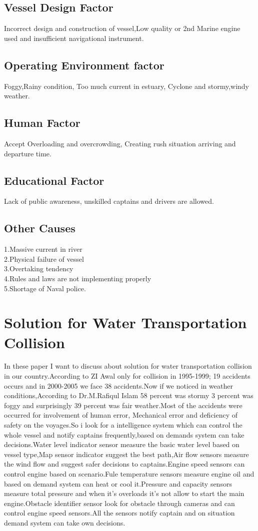 \documentclass{article}
\begin{document}
\subsection{Vessel Design Factor}
Incorrect design and construction of vessel,Low quality or 2nd Marine engine used and insufficient navigational instrument.
\subsection{Operating Environment factor}
Foggy,Rainy condition, Too much current in estuary, Cyclone and stormy,windy weather.
\subsection{Human Factor}
Accept Overloading and overcrowding, Creating rush situation arriving and departure time.
\subsection{Educational Factor}
Lack of public awareness, unskilled captains and drivers are allowed.
\subsection{Other Causes}
1.Massive current in river\\
2.Physical failure of vessel\\
3.Overtaking tendency\\
4.Rules and laws are not implementing properly\\
5.Shortage of Naval police\cite{ibn2010collision}.
\section{Solution for Water Transportation Collision}
In these paper I want to discuss about solution for water transportation collision in our country.According to ZI Awal only for collision in 1995-1999; 19 accidents occurs and in 2000-2005 we face 38 accidents\cite{awal2014study}.Now if we noticed in weather conditions,According to Dr.M.Rafiqul Islam 58 percent was stormy 3 percent was foggy and surprisingly 39 percent was fair weather\cite{rahman2017analysis}.Most of the accidents were occurred for involvement of human error, Mechanical error and deficiency of safety on the voyages\cite{turland1995quantification}.So i look for a intelligence system which can control the whole vessel and notify captains frequently,based on demands system can take decisions.Water level indicator sensor measure the basic water level based on vessel type,Map sensor indicator suggest the best path,Air flow sensors measure the wind flow and suggest safer decisions to captains.Engine speed sensors can control engine based on scenario.Fule temperature sensors measure engine oil and based on demand system can heat or cool it.Pressure and capacity sensors measure total pressure and when it's overloads it's not allow to start the main engine.Obstacle identifier sensor look for obstacle through cameras and can control engine speed sensors.All the sensors notify captain and on situation demand system can take own decisions\cite{awal2014study}.
\end{document}
